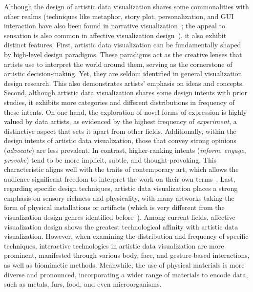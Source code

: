 Although the design of artistic data visualization shares some commonalities with other realms (\eg techniques like metaphor, story plot, personalization, and GUI interaction have also been found in narrative visualization~\cite{segel2010narrative,shi2021communicating,lan2022negative}; the appeal to sensation is also common in affective visualization design~\cite{lan2023affective}), it also exhibit distinct features.
First, artistic data visualization can be fundamentally shaped by high-level design paradigms. These paradigms act as the creative lenses that artists use to interpret the world around them, serving as the cornerstone of artistic decision-making. Yet, they are seldom identified in general visualization design research. This also demonstrates artists' emphasis on ideas and concepts.
Second, although artistic data visualization shares some design intents with prior studies, it exhibits more categories and different distributions in frequency of these intents. On one hand, the exploration of novel forms of expression is highly valued by data artists, as evidenced by the highest frequency of \textit{experiment}, a distinctive aspect that sets it apart from other fields. Additionally, within the design intents of artistic data visualization, those that convey strong opinions (\eg \textit{advocate}) are less prevalent. In contrast, higher-ranking intents (\eg \textit{inform}, \textit{engage}, \textit{provoke}) tend to be more implicit, subtle, and thought-provoking. This characteristic aligns well with the traits of contemporary art, which allows the audience significant freedom to interpret the work on their own terms~\cite{pooke2021art}.
Last, regarding specific design techniques, artistic data visualization places a strong emphasis on sensory richness and physicality, with many artworks taking the form of physical installations or artifacts (which is very different from the visualization design genres identified before~\cite{segel2010narrative}). Among current fields, affective visualization design shows the greatest technological affinity with artistic data visualization. However, when examining the distribution and frequency of specific techniques, interactive technologies in artistic data visualization are more prominent, manifested through various body, face, and gesture-based interactions, as well as biomimetic methods. Meanwhile, the use of physical materials is more diverse and pronounced, incorporating a wider range of materials to encode data, such as metals, furs, food, and even microorganisms.






